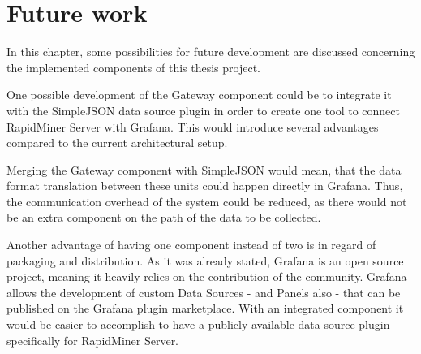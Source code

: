\chapter{Future work}

In this chapter, some possibilities for future development are discussed concerning the implemented components of this thesis project.

One possible development of the Gateway component could be to integrate it with the SimpleJSON data source plugin in order to create one tool to connect RapidMiner Server with Grafana. This would introduce several advantages compared to the current architectural setup.

Merging the Gateway component with SimpleJSON would mean, that the data format translation between these units could happen directly in Grafana. Thus, the communication overhead of the system could be reduced, as there would not be an extra component on the path of the data to be collected.



Another advantage of having one component instead of two is in regard of packaging and distribution. As it was already stated, Grafana is an open source project, meaning it heavily relies on the contribution of the community. Grafana allows the development of custom Data Sources - and Panels also - that can be published on the Grafana plugin marketplace. With an integrated component it would be easier to accomplish to have a publicly available data source plugin specifically for RapidMiner Server. 